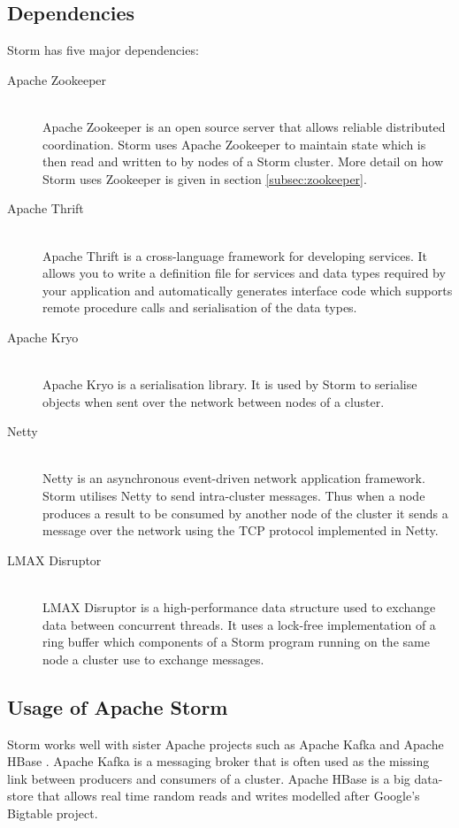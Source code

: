 \documentclass[bsc,logo,frontabs,twoside,singlespacing,normalheadings,parskip]{infthesis}\usepackage[]{graphicx}\usepackage[]{color}
\begin{document}
\subsection{Dependencies}

Storm has five major dependencies:

\begin{description}
	\item[Apache Zookeeper] \hfill \\
	Apache Zookeeper \cite{ApacheZookeeper} is an open source server that allows reliable distributed coordination. Storm uses Apache Zookeeper to maintain state which is then read and written to by nodes of a Storm cluster. More detail on how Storm uses Zookeeper is given in section \ref{subsec:zookeeper}.
	\item[Apache Thrift] \hfill \\
	Apache Thrift \cite{ApacheThrift} is a cross-language framework for developing services. It allows you to write a definition file for services and data types required by your application and automatically generates interface code which supports remote procedure calls and serialisation of the data types.
	\item[Apache Kryo] \hfill \\
	Apache Kryo \cite{ApacheKryo} is a serialisation library. It is used by Storm to serialise objects when sent over the network between nodes of a cluster.
	\item[Netty] \hfill \\
	Netty \cite{Netty} is an asynchronous event-driven network application framework. Storm utilises Netty to send intra-cluster messages. Thus when a node produces a result to be consumed by another node of the cluster it sends a message over the network using the TCP protocol implemented in Netty.
	\item[LMAX Disruptor] \hfill \\
	LMAX Disruptor \cite{LMAXDisruptor} is a high-performance data structure used to exchange data between concurrent threads. It uses a lock-free implementation of a ring buffer which components of a Storm program running on the same node a cluster use to exchange messages.
\end{description}

\subsection{Usage of Apache Storm}

Storm works well with sister Apache projects such as Apache Kafka \cite{ApacheKafka} and Apache HBase \cite{ApacheHBase}. Apache Kafka is a messaging broker that is often used as the missing link between producers and consumers of a cluster. Apache HBase is a big data-store that allows real time random reads and writes modelled after Google's Bigtable project. \cite{Bigtable}
\end{document}
